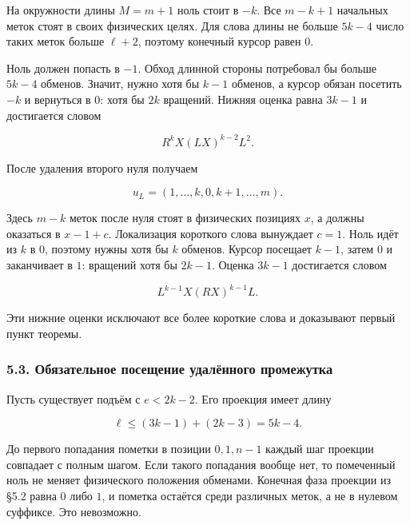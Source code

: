\documentclass[
  11pt,
  a4paper,
]{article}
\begin{document}
На окружности длины \(M=m+1\) ноль стоит в \(-k\). Все \(m-k+1\)
начальных меток стоят в своих физических целях. Для слова длины не
больше \(5k-4\) число таких меток больше \(\ell+2\), поэтому конечный
курсор равен \(0\).

Ноль должен попасть в \(-1\). Обход длинной стороны потребовал бы больше
\(5k-4\) обменов. Значит, нужно хотя бы \(k-1\) обменов, а курсор обязан
посетить \(-k\) и вернуться в \(0\): хотя бы \(2k\) вращений. Нижняя
оценка равна \(3k-1\) и достигается словом

\[R^k X(LX)^{k-2}L^2. \tag{9}\]

После удаления второго нуля получаем

\[u_L=(1,\ldots,k,0,k+1,\ldots,m).\]

Здесь \(m-k\) меток после нуля стоят в физических позициях \(x\), а
должны оказаться в \(x-1+c\). Локализация короткого слова вынуждает
\(c=1\). Ноль идёт из \(k\) в \(0\), поэтому нужны хотя бы \(k\)
обменов. Курсор посещает \(k-1\), затем \(0\) и заканчивает в \(1\):
вращений хотя бы \(2k-1\). Оценка \(3k-1\) достигается словом

\[L^{k-1}X(RX)^{k-1}L. \tag{10}\]

Эти нижние оценки исключают все более короткие слова и доказывают первый
пункт теоремы.

\hypertarget{ux43eux431ux44fux437ux430ux442ux435ux43bux44cux43dux43eux435-ux43fux43eux441ux435ux449ux435ux43dux438ux435-ux443ux434ux430ux43bux451ux43dux43dux43eux433ux43e-ux43fux440ux43eux43cux435ux436ux443ux442ux43aux430}{%
\subsubsection{5.3. Обязательное посещение удалённого
промежутка}\label{ux43eux431ux44fux437ux430ux442ux435ux43bux44cux43dux43eux435-ux43fux43eux441ux435ux449ux435ux43dux438ux435-ux443ux434ux430ux43bux451ux43dux43dux43eux433ux43e-ux43fux440ux43eux43cux435ux436ux443ux442ux43aux430}}

Пусть существует подъём с \(e<2k-2\). Его проекция имеет длину

\[\ell\le(3k-1)+(2k-3)=5k-4. \tag{11}\]

До первого попадания пометки в позиции \(0,1,n-1\) каждый шаг проекции
совпадает с полным шагом. Если такого попадания вообще нет, то
помеченный ноль не меняет физического положения обменами. Конечная фаза
проекции из §5.2 равна \(0\) либо \(1\), и пометка остаётся среди
различных меток, а не в нулевом суффиксе. Это невозможно.
\end{document}
